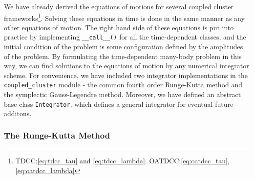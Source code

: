     We have already derived the equations of motions for several coupled 
    cluster frameworks\footnote{TDCC:\autoref{eq:tdcc_tau} and
    \autoref{eq:tdcc_lambda}.
    OATDCC:\autoref{eq:oatdcc_tau}, \autoref{eq:oatdcc_lambda}}. Solving these equations 
    in time is done in the same manner as any other equations of motion. The right hand 
    side of these equations is put into practice by implementing \lstinline{__call__()} for 
    all the time-dependent classes, and the initial condition of the problem is some 
    configuration defined by the amplitudes of the problem. By formulating the time-dependent
    many-body problem in this way, we can find solutions to the equations of motion by 
    any numerical integrator scheme. For convenience, we have included two integrator 
    implementations in the \lstinline{coupled_cluster} module - the common fourth order 
    Runge-Kutta method and the symplectic Gauss-Legendre method. Moreover, we have defined an 
    abstract base class \lstinline{Integrator}, which defines a general integrator for 
    eventual future additons.

    \subsubsection{The Runge-Kutta Method}

    \begin{figure}
    
    \end{figure}

